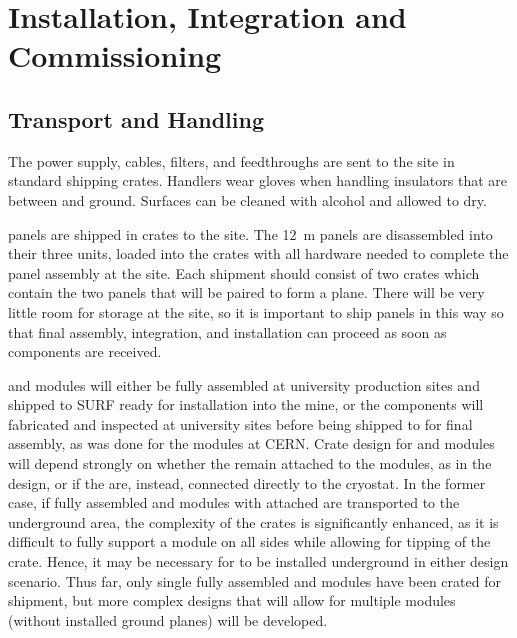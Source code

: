 \section{Installation, Integration and Commissioning}
\label{sec:fdsp-hv-install}

\subsection{Transport and Handling}
\label{sec:fdsp-hv-install-transport}

The power supply, cables, filters, and feedthroughs are sent to the site in standard shipping crates.  Handlers wear gloves when handling insulators that are between  and ground.  Surfaces can be cleaned with alcohol and allowed to dry.

 panels are shipped in crates to the \surf site.  The \SI{12}{\m}  panels are disassembled into their three  units, loaded into the crates with all hardware needed to complete the  panel assembly at the \surf site.  Each shipment should consist of two crates which contain the two  panels that will be paired to form a  plane. There will be very little room for storage at the \surf site, so it is important to ship  panels in this way so that final assembly, integration, and installation can proceed as soon as components are received.

 and  modules will either be fully assembled at university production sites and shipped to SURF ready for installation into the mine, or the components will fabricated and  inspected at university sites before being shipped to \surf for final assembly, as was done for the  modules at CERN. Crate design for  and  modules will depend strongly on whether the  remain attached to the modules, as in the  design, or if the  are, instead, connected directly to the cryostat. In the former case, if fully assembled  and  modules with attached  are transported to the underground area, the complexity of the crates is significantly enhanced, as it is difficult to fully support a module on all sides while allowing for tipping of the crate. Hence, it may be necessary for  to be installed underground in either design scenario. Thus far, only single fully assembled  and  modules have been crated for shipment, but more complex designs that will allow for multiple modules (without installed ground planes) will be developed.


